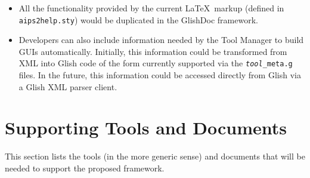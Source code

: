 \begin{itemize}
\item All the functionality provided by the current \LaTeX\ markup
(defined in {\tt aips2help.sty}) would be duplicated in the GlishDoc
framework.  

\item Developers can also include information needed by the Tool
Manager to build GUIs automatically.  Initially, this information
could be transformed from XML into Glish code of the form currently
supported via the {\tt {\it tool}\_meta.g} files.  In the future, this
information could be accessed directly from Glish via a Glish XML parser
client.  

\end{itemize}

\section{Supporting Tools and Documents}

This section lists the tools (in the more generic sense) and documents
that will be needed to support the proposed framework.

